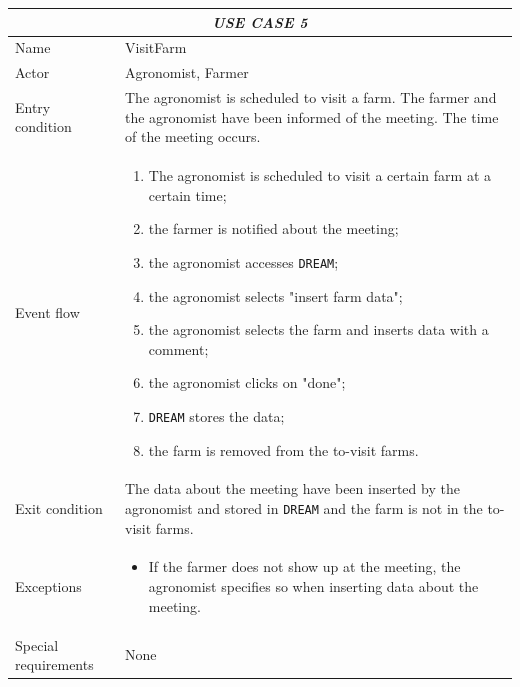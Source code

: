 \documentclass{article}
\begin{document}
\centering
\begin{tabular}{|p{3.5cm}|m{8cm}|}
 \hline
 \multicolumn{2}{|c|}{\emph{USE CASE 5}} \\
 \hline
 Name & VisitFarm\\
 \hline
 Actor & Agronomist, Farmer\\
 \hline
 Entry condition & The agronomist is scheduled to visit a farm. The farmer and the agronomist have been informed of the meeting. The time of the meeting occurs.\\
 \hline
 Event flow & \begin{enumerate}
    \item The agronomist is scheduled to visit a certain farm at a certain time;
    \item the farmer is notified about the meeting;
    \item the agronomist accesses \verb|DREAM|;
    \item the agronomist selects "insert farm data";
    \item the agronomist selects the farm and inserts data with a comment;
    \item the agronomist clicks on "done";
    \item \verb|DREAM| stores the data;
    \item the farm is removed from the to-visit farms.
 \end{enumerate}\\
 \hline
 Exit condition & The data about the meeting have been inserted by the agronomist and stored in \verb|DREAM| and the farm is not in the to-visit farms.\\
 \hline
 Exceptions & \begin{itemize}
     \item If the farmer does not show up at the meeting, the agronomist specifies so when inserting data about the meeting.
 \end{itemize}\\
 \hline
 Special requirements & None\\
 \hline
\end{tabular}
\end{document}
